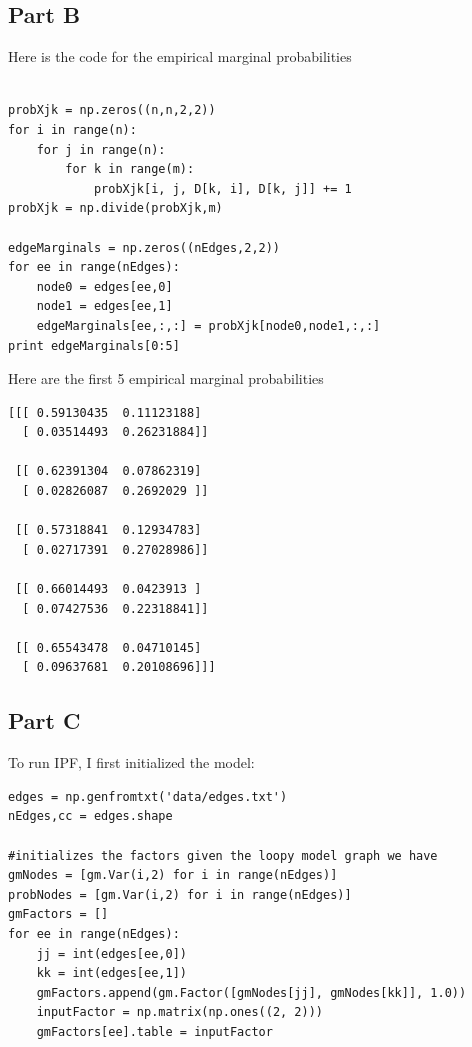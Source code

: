 \documentclass[twoside,11pt]{article}
\theoremstyle{definition}
\begin{document}
\newpage

\subsection*{Part B}

Here is the code for the empirical marginal probabilities
\begin{lstlisting}

probXjk = np.zeros((n,n,2,2))
for i in range(n):
    for j in range(n):
        for k in range(m):
            probXjk[i, j, D[k, i], D[k, j]] += 1
probXjk = np.divide(probXjk,m)

edgeMarginals = np.zeros((nEdges,2,2))
for ee in range(nEdges):
    node0 = edges[ee,0]
    node1 = edges[ee,1]
    edgeMarginals[ee,:,:] = probXjk[node0,node1,:,:]
print edgeMarginals[0:5]

\end{lstlisting}

Here are the first 5 empirical marginal probabilities

\begin{lstlisting}
[[[ 0.59130435  0.11123188]
  [ 0.03514493  0.26231884]]

 [[ 0.62391304  0.07862319]
  [ 0.02826087  0.2692029 ]]

 [[ 0.57318841  0.12934783]
  [ 0.02717391  0.27028986]]

 [[ 0.66014493  0.0423913 ]
  [ 0.07427536  0.22318841]]

 [[ 0.65543478  0.04710145]
  [ 0.09637681  0.20108696]]]
\end{lstlisting}
\newpage
\subsection*{Part C}
To run IPF, I first initialized the model:

\begin{lstlisting}
edges = np.genfromtxt('data/edges.txt')
nEdges,cc = edges.shape

#initializes the factors given the loopy model graph we have
gmNodes = [gm.Var(i,2) for i in range(nEdges)]
probNodes = [gm.Var(i,2) for i in range(nEdges)]
gmFactors = []
for ee in range(nEdges):
    jj = int(edges[ee,0])
    kk = int(edges[ee,1])
    gmFactors.append(gm.Factor([gmNodes[jj], gmNodes[kk]], 1.0))
    inputFactor = np.matrix(np.ones((2, 2)))
    gmFactors[ee].table = inputFactor
\end{lstlisting}

\newpage 
\end{document}
